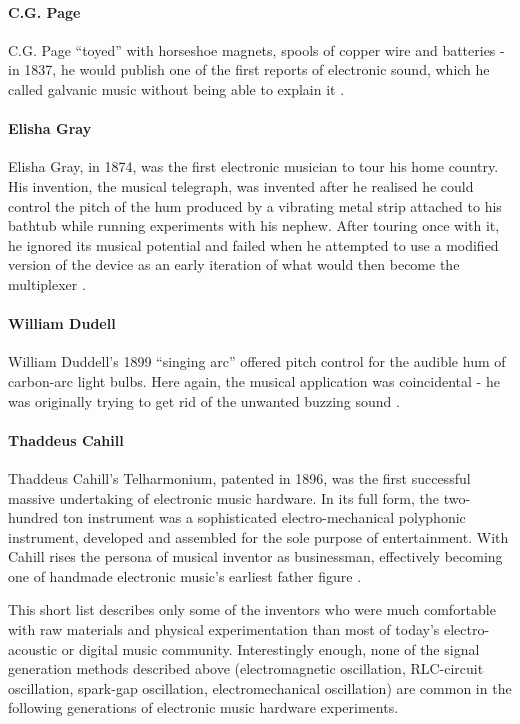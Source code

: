 \paragraph{C.G. Page}

	C.G. Page “toyed” with horseshoe magnets, spools of copper wire and batteries - in 1837, he would publish one of the first reports of electronic sound, which he called galvanic music without being able to explain it \cite{page1837}. 
	
\paragraph{Elisha Gray}

	Elisha Gray, in 1874, was the first electronic musician to tour his home country. His invention, the musical telegraph, was invented after he realised he could control the pitch of the hum produced by a vibrating metal strip attached to his bathtub while running experiments with his nephew. After touring once with it, he ignored its musical potential and failed when he attempted to use a modified version of the device as an early iteration of what would then become the multiplexer \cite{holmes2002}. 
	
\paragraph{William Dudell}

	William Duddell’s 1899 “singing arc” offered pitch control for the audible hum of carbon-arc light bulbs. Here again, the musical application was coincidental - he was originally trying to get rid of the unwanted buzzing sound \cite{nasmyth1908,holmes2002}. 

\paragraph{Thaddeus Cahill}

	Thaddeus Cahill’s Telharmonium, patented in 1896, was the first successful massive undertaking of electronic music hardware. In its full form, the two-hundred ton instrument was a sophisticated electro-mechanical polyphonic instrument, developed and assembled for the sole purpose of entertainment. With Cahill rises the persona of musical inventor as businessman, effectively becoming one of handmade electronic music’s earliest father figure \cite{holmes2002}. 

	This short list describes only some of the inventors who were much comfortable with raw materials and physical experimentation than most of today’s electro-acoustic or digital music community. Interestingly enough, none of the signal generation methods described above (electromagnetic oscillation, RLC-circuit oscillation, spark-gap oscillation, electromechanical oscillation) are common in the following generations of electronic music hardware experiments. 

